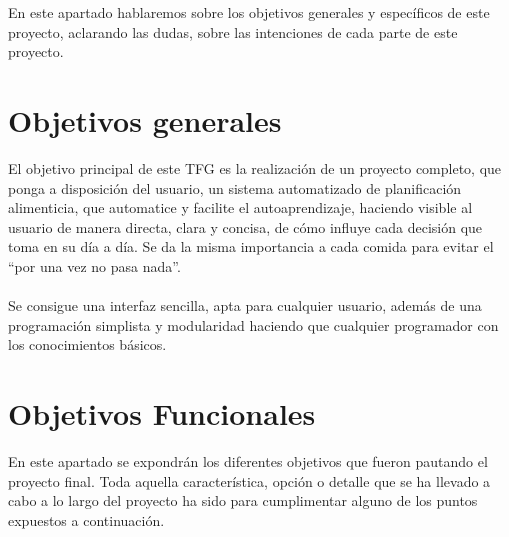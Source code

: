 
En este apartado hablaremos sobre los objetivos generales y específicos de este proyecto, aclarando las dudas, sobre las intenciones de cada parte de este proyecto.
\section{Objetivos generales}
El objetivo principal de este TFG es la realización de un proyecto completo, que ponga a disposición del usuario, un sistema automatizado de planificación alimenticia, que automatice y facilite el autoaprendizaje, haciendo visible al usuario de manera directa, clara y concisa, de cómo influye cada decisión que toma en su día a día. Se da la misma importancia a cada comida para evitar el “por una vez no pasa nada”. \\
\\
Se consigue una interfaz sencilla, apta para cualquier usuario, además de una programación simplista y modularidad haciendo que cualquier programador con los conocimientos básicos.
\\
\section{Objetivos Funcionales}
En este apartado se expondrán los diferentes objetivos que fueron pautando el proyecto final. Toda aquella característica, opción o detalle que se ha llevado a cabo a lo largo del proyecto ha sido para cumplimentar alguno de los puntos expuestos a continuación.

